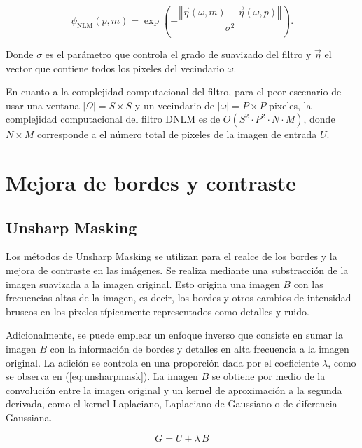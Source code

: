\begin{equation}
\label{eq:nlmfunc}

\psi_{\textrm{NLM}}\left(p,m\right)=\exp\left(-\frac{\left\Vert \vec{\eta}\left(\omega,m\right)-\vec{\eta}\left(\omega,p\right)\right\Vert }{\sigma^{2}}\right).

\end{equation}

Donde $\sigma$ es el par\'ametro que controla el grado de suavizado del filtro y $\vec{\eta}$ el vector que contiene todos los pixeles del vecindario $\omega$.

En cuanto a la complejidad computacional del filtro, para el peor escenario de usar una ventana $|\Omega| = S \times S$ y un vecindario de $|\omega| = P \times P$ pixeles, la complejidad computacional del filtro DNLM es de $O(S^2 \cdot P^2 \cdot N \cdot M)$, donde $N \times M$ corresponde a el n\'umero total de pixeles de la imagen de entrada $U$. 



\section{Mejora de bordes y contraste}

\subsection{Unsharp Masking}
\label{ch:marco_usm}

Los m\'etodos de Unsharp Masking se utilizan para el realce de los bordes y la mejora de contraste en las im\'agenes. Se realiza mediante una substracci\'on de la imagen suavizada a la imagen original. Esto origina una imagen $B$ con las frecuencias altas de la imagen, es decir, los bordes y otros cambios de intensidad bruscos en los pixeles t\'ipicamente representados como detalles y ruido. 

Adicionalmente, se puede emplear un enfoque inverso que consiste en sumar la imagen $B$ con la informaci\'on de bordes y detalles en alta frecuencia a la imagen original. La adici\'on se controla en una proporci\'on dada por el coeficiente $\lambda$, como se observa en (\ref{eq:unsharpmask}). La imagen $B$ se obtiene por medio de la convoluci\'on entre la imagen original y un kernel de aproximaci\'on a la segunda derivada, como el kernel Laplaciano, Laplaciano de Gaussiano o de diferencia Gaussiana.

\begin{equation}
\label{eq:unsharpmask}
G=U+\lambda\,B
\end{equation}


